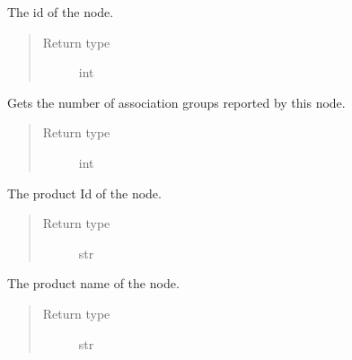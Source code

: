 \documentclass[letterpaper,10pt,english]{sphinxmanual}
\begin{document}
\begin{fulllineitems}

\begin{fulllineitems}
\label{node:openzwave.node.ZWaveNode.node_id}
The id of the node.
\begin{quote}\begin{description}
\item[{Return type}] \leavevmode
int

\end{description}\end{quote}

\end{fulllineitems}


\begin{fulllineitems}
\label{node:openzwave.node.ZWaveNode.num_groups}
Gets the number of association groups reported by this node.
\begin{quote}\begin{description}
\item[{Return type}] \leavevmode
int

\end{description}\end{quote}

\end{fulllineitems}


\begin{fulllineitems}
\label{node:openzwave.node.ZWaveNode.product_id}
The product Id of the node.
\begin{quote}\begin{description}
\item[{Return type}] \leavevmode
str

\end{description}\end{quote}

\end{fulllineitems}


\begin{fulllineitems}
\label{node:openzwave.node.ZWaveNode.product_name}
The product name of the node.
\begin{quote}\begin{description}
\item[{Return type}] \leavevmode
str


\end{description}
\end{quote}
\end{fulllineitems}
\end{fulllineitems}
\end{document}
